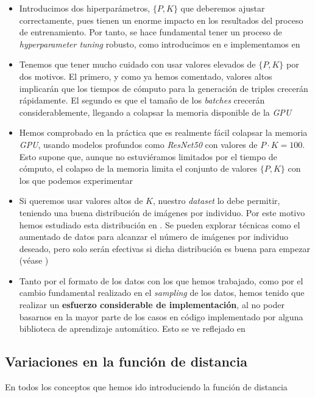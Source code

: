 \begin{itemize}
    \item Introducimos dos hiperparámetros, $\{P, K\}$ que deberemos ajustar correctamente, pues tienen un enorme impacto en los resultados del proceso de entrenamiento. Por tanto, se hace fundamental tener un proceso de \textit{hyperparameter tuning} robusto, como introducimos en  e implementamos en 
    \item Tenemos que tener mucho cuidado con usar valores elevados de $\{P, K\}$ por dos motivos. El primero, y como ya hemos comentado, valores altos implicarán que los tiempos de cómputo para la generación de triples crecerán rápidamente. El segundo es que el tamaño de los \textit{batches} crecerán considerablemente, llegando a colapsar la memoria disponible de la \textit{GPU}
    \item Hemos comprobado en la práctica que es realmente fácil colapsar la memoria \textit{GPU}, usando modelos profundos como \textit{ResNet50} con valores de $P \cdot K = 100$. Esto supone que, aunque no estuviéramos limitados por el tiempo de cómputo, el colapso de la memoria limita el conjunto de valores $\{P, K\}$ con los que podemos experimentar
    \item Si queremos usar valores altos de $K$, nuestro \textit{dataset} lo debe permitir, teniendo una buena distribución de imágenes por individuo. Por este motivo hemos estudiado esta distribución en . Se pueden explorar técnicas como el aumentado de datos para alcanzar el número de imágenes por individuo deseado, pero solo serán efectivas si dicha distribución es buena para empezar (véase )
    \item Tanto por el formato de los datos con los que hemos trabajado, como por el cambio fundamental realizado en el \textit{sampling} de los datos, hemos tenido que realizar un \textbf{esfuerzo considerable de implementación}, al no poder basarnos en la mayor parte de los casos en código implementado por alguna biblioteca de aprendizaje automático. Esto se ve reflejado en 
\end{itemize}

\subsection{Variaciones en la función de distancia}

En todos los conceptos que hemos ido introduciendo la función de distancia

